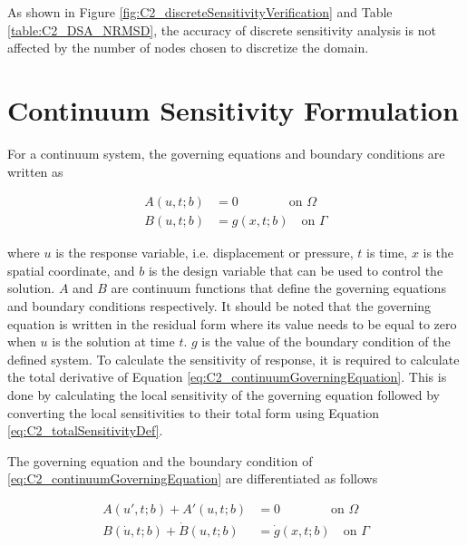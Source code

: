 As shown in Figure \ref{fig:C2_discreteSensitivityVerification} and Table \ref{table:C2_DSA_NRMSD}, the accuracy of discrete sensitivity analysis is not affected by the number of nodes chosen to discretize the domain.

\section{Continuum Sensitivity Formulation}
For a continuum system, the governing equations and boundary conditions are written as

\begin{subequations}\label{eq:C2_continuumGoverningEquation}
\begin{align}
	A(u, t; b) &= 0 \qquad \qquad \text{on } \Omega \\
	B(u, t; b) &= g(x, t; b) \quad \text{on } \Gamma
\end{align}	
\end{subequations}

where $u$ is the response variable, i.e. displacement or pressure, $t$ is time, $x$ is the spatial coordinate, and $b$ is the design variable that can be used to control the solution. $A$ and $B$ are continuum functions that define the governing equations and boundary conditions respectively. It should be noted that the governing equation is written in the residual form where its value needs to be equal to zero when $u$ is the solution at time $t$. $g$ is the value of the boundary condition of the defined system. To calculate the sensitivity of response, it is required to calculate the total derivative of Equation \eqref{eq:C2_continuumGoverningEquation}. This is done by calculating the local sensitivity of the governing equation followed by converting the local sensitivities to their total form using Equation \eqref{eq:C2_totalSensitivityDef}.

The governing equation and the boundary condition of \eqref{eq:C2_continuumGoverningEquation} are differentiated as follows

\begin{subequations}\label{eq:C2_continuumSensitivityFormulation}
\begin{align}
	A(u', t; b) + A'(u, t; b) &= 0 \qquad \qquad \text{on } \Omega \\
	B(\dot{u}, t; b) + \dot{B}(u, t; b) &= \dot{g}(x, t; b) \quad \text{on } \Gamma
\end{align}	
\end{subequations}

